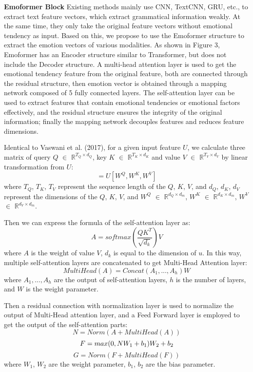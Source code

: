 \noindent\textbf{Emoformer Block} Existing methods mainly use CNN, TextCNN, GRU, etc., to extract text feature vectors, which extract grammatical information weakly. At the same time, they only take the original feature vectors without emotional tendency as input. Based on this, we propose to use the Emoformer structure to extract the emotion vectors of various modalities. As shown in Figure 3, Emoformer has an Encoder structure similar to Transformer, but does not include the Decoder structure. A multi-head attention layer is used to get the emotional tendency feature from the original feature, both are connected through the residual structure, then emotion vector is obtained through a mapping network composed of 5 fully connected layers. The self-attention layer can be used to extract features that contain emotional tendencies or emotional factors effectively, and the residual structure ensures the integrity of the original information; finally the mapping network decouples features and reduces feature dimensions.

Identical to Vaswani et al. (2017), for a given input feature $U$, we calculate three matrix of query $Q$ $\in$ $\mathbb{R}^{{T}_{Q} \times {d}_{Q}}$, key $K$ $\in$ $\mathbb{R}^{{T}_{K} \times {d}_{K}}$ and value $V$ $\in$ $\mathbb{R}^{{T}_{V} \times {d}_{V}}$ by linear transformation from $U$:
\begin{equation}
	[Q,K,V]=U [W^Q,W^K,W^V]
\end{equation}
where ${T}_{Q}$, ${T}_{K}$, ${T}_{V}$ represent the sequence length of the $Q$, $K$, $V$, and ${d}_{Q}$, ${d}_{K}$, ${d}_{V}$ represent the dimensions of the $Q$, $K$, $V$, and $W^Q$ $\in$ $\mathbb{R}^{{d}_{Q} \times {d}_{m}}$, $W^K$ $\in$ $\mathbb{R}^{{d}_{K} \times {d}_{m}}$, $W^V$ $\in$ $\mathbb{R}^{{d}_{V} \times {d}_{m}}$.

Then we can express the formula of the self-attention layer as:
\begin{equation}
	A=softmax (\frac{QK^{T}}{\sqrt{d_k}})V
\end{equation}
where $A$ is the weight of value $V$, $d_k$ is equal to the dimension of $u$. In this way, multiple self-attention layers are concatenated to get Multi-Head Attention layer:
\begin{equation}
	MultiHead (A)=Concat (A_1,...,A_h) W
\end{equation}
where $A_1,...,A_h$ are the output of self-attention layers, $h$ is the number of layers, and $W$ is the weight parameter.

Then a residual connection with normalization layer is used to normalize the output of Multi-Head attention layer, and a Feed Forward layer is employed to get the output of the self-attention parts:
\begin{equation}	
	N=Norm (A+MultiHead (A))
\end{equation}
\begin{equation}
	F=max (0,NW_1+b_1)W_2+b_2\vspace{0.6ex}
\end{equation}
\begin{equation}
	G=Norm(F+MultiHead(F))
\end{equation}
where $W_1$, $W_2$ are the weight parameter, $b_1$, $b_2$ are the bias parameter.

